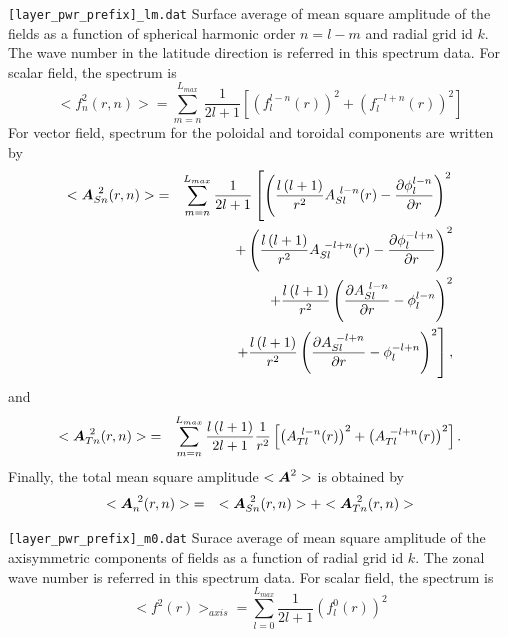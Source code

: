 \begin{description}
\item{\tt [layer\_pwr\_prefix]\_lm.dat} Surface average of mean square amplitude of the fields as a function of spherical harmonic order $n = l-m$ and radial grid id $k$. The wave number in the latitude direction is referred in this spectrum data.
For scalar field, the spectrum is
%
\begin{equation}
<f_{n}^{2}(r,n)> = \sum_{m=n}^{L_{max}} \frac{1}{2l + 1} \left[ \left(f_{l}^{l-n}(r) \right)^2 
+ \left(f_{l}^{-l+n}(r) \right)^2 \right]
\end{equation}
%
For vector field, spectrum for the poloidal and toroidal components are written by 
%
\begin{eqnarray}
<\mbox{\boldmath$A$}_{Sn}^{\ 2}(r,n)> &=&   \sum_{m=n}^{L_{max}}\frac{1}{2l + 1}
\left[  \left(\frac{l\left(l+1 \right) }{r^{2}} A_{Sl}^{\ l-n}(r) - \frac{\partial \phi_{l}^{l-n}}{\partial r} \right)^{2} 
\right. \nonumber \\
& & + \left(\frac{l\left(l+1 \right) }{r^{2}} A_{Sl}^{\ -l+n}(r) - \frac{\partial \phi_{l}^{-l+n}}{\partial r} \right)^{2} 
\nonumber \\
& & +  \frac{l \left( l+1 \right)}{r^{2}} \left( \frac{\partial A_{Sl}^{\ l-n}}{\partial r} - \phi_{l}^{l-n} \right)^{2} 
\nonumber \\
& & \left. +  \frac{l \left( l+1 \right)}{r^{2}} \left( \frac{\partial A_{Sl}^{\ -l+n}}{\partial r} - \phi_{l}^{-l+n} \right)^{2} \right],
\end{eqnarray}
%
and
\begin{eqnarray}
<\mbox{\boldmath$A$}_{Tn}^{\ 2}(r,n)> &=&  \sum_{m=n}^{L_{max}}\frac{l \left( l+1 \right)}{2l + 1} \frac{1}{r^{2}} 
\left[ \left( A_{Tl}^{\ l-n}(r) \right)^{2} +  \left( A_{Tl}^{\ -l+n}(r) \right)^{2} \right].
\end{eqnarray}
Finally, the total mean square amplitude $<\mbox{\boldmath$A$}^{2}> $ is obtained by
\begin{eqnarray}
<\bvec{A}_{n}^{\ 2}(r,n)> &=& <\bvec{A}_{Sn}^{\ 2}(r,n)>  + <\bvec{A}_{Tn}^{\ 2}(r,n)> 
\end{eqnarray}
%
\item{\tt [layer\_pwr\_prefix]\_m0.dat} Surace average of mean square amplitude of the axisymmetric components of fields as a function of radial grid id $k$. The zonal wave number is referred in this spectrum data. For scalar field, the spectrum is
%
\begin{equation}
<f^{2}(r)>_{axis} = \sum_{l=0}^{L_{max}}  \frac{1}{2l + 1} \left(f_{l}^{0}(r) \right)^2
\end{equation}

\end{description}
